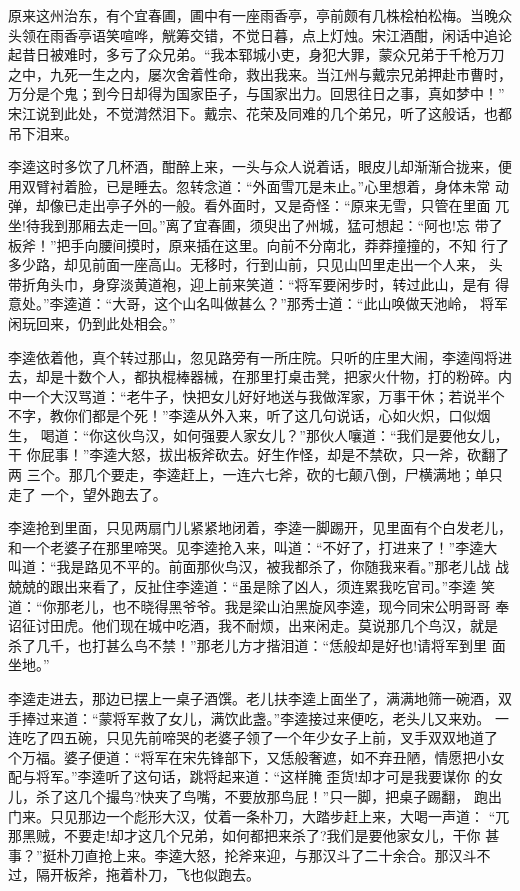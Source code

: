 原来这州治东，有个宜春圃，圃中有一座雨香亭，亭前颇有几株桧柏松梅。当晚众
头领在雨香亭语笑喧哗，觥筹交错，不觉日暮，点上灯烛。宋江酒酣，闲话中追论
起昔日被难时，多亏了众兄弟。“我本郓城小吏，身犯大罪，蒙众兄弟于千枪万刀
之中，九死一生之内，屡次舍着性命，救出我来。当江州与戴宗兄弟押赴市曹时，
万分是个鬼；到今日却得为国家臣子，与国家出力。回思往日之事，真如梦中！”
宋江说到此处，不觉潸然泪下。戴宗、花荣及同难的几个弟兄，听了这般话，也都
吊下泪来。

李逵这时多饮了几杯酒，酣醉上来，一头与众人说着话，眼皮儿却渐渐合拢来，便
用双臂衬着脸，已是睡去。忽转念道：“外面雪兀是未止。”心里想着，身体未常
动弹，却像已走出亭子外的一般。看外面时，又是奇怪：“原来无雪，只管在里面
兀坐!待我到那厢去走一回。”离了宜春圃，须臾出了州城，猛可想起：“阿也!忘
带了板斧！”把手向腰间摸时，原来插在这里。向前不分南北，莽莽撞撞的，不知
行了多少路，却见前面一座高山。无移时，行到山前，只见山凹里走出一个人来，
头带折角头巾，身穿淡黄道袍，迎上前来笑道：“将军要闲步时，转过此山，是有
得意处。”李逵道：“大哥，这个山名叫做甚么？”那秀士道：“此山唤做天池岭，
将军闲玩回来，仍到此处相会。”

李逵依着他，真个转过那山，忽见路旁有一所庄院。只听的庄里大闹，李逵闯将进
去，却是十数个人，都执棍棒器械，在那里打桌击凳，把家火什物，打的粉碎。内
中一个大汉骂道：“老牛子，快把女儿好好地送与我做浑家，万事干休；若说半个
不字，教你们都是个死！”李逵从外入来，听了这几句说话，心如火炽，口似烟生，
喝道：“你这伙鸟汉，如何强要人家女儿？”那伙人嚷道：“我们是要他女儿，干
你屁事！”李逵大怒，拔出板斧砍去。好生作怪，却是不禁砍，只一斧，砍翻了两
三个。那几个要走，李逵赶上，一连六七斧，砍的七颠八倒，尸横满地；单只走了
一个，望外跑去了。

李逵抢到里面，只见两扇门儿紧紧地闭着，李逵一脚踢开，见里面有个白发老儿，
和一个老婆子在那里啼哭。见李逵抢入来，叫道：“不好了，打进来了！”李逵大
叫道：“我是路见不平的。前面那伙鸟汉，被我都杀了，你随我来看。”那老儿战
战兢兢的跟出来看了，反扯住李逵道：“虽是除了凶人，须连累我吃官司。”李逵
笑道：“你那老儿，也不晓得黑爷爷。我是梁山泊黑旋风李逵，现今同宋公明哥哥
奉诏征讨田虎。他们现在城中吃酒，我不耐烦，出来闲走。莫说那几个鸟汉，就是
杀了几千，也打甚么鸟不禁！”那老儿方才揩泪道：“恁般却是好也!请将军到里
面坐地。”

李逵走进去，那边已摆上一桌子酒馔。老儿扶李逵上面坐了，满满地筛一碗酒，双
手捧过来道：“蒙将军救了女儿，满饮此盏。”李逵接过来便吃，老头儿又来劝。
一连吃了四五碗，只见先前啼哭的老婆子领了一个年少女子上前，叉手双双地道了
个万福。婆子便道：“将军在宋先锋部下，又恁般奢遮，如不弃丑陋，情愿把小女
配与将军。”李逵听了这句话，跳将起来道：“这样腌歪货!却才可是我要谋你
的女儿，杀了这几个撮鸟?快夹了鸟嘴，不要放那鸟屁！”只一脚，把桌子踢翻，
跑出门来。只见那边一个彪形大汉，仗着一条朴刀，大踏步赶上来，大喝一声道：
“兀那黑贼，不要走!却才这几个兄弟，如何都把来杀了?我们是要他家女儿，干你
甚事？”挺朴刀直抢上来。李逵大怒，抡斧来迎，与那汉斗了二十余合。那汉斗不
过，隔开板斧，拖着朴刀，飞也似跑去。

